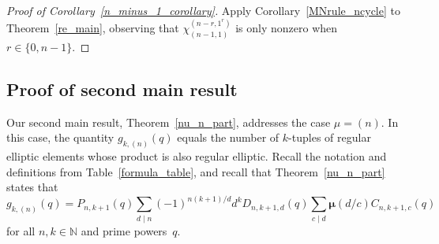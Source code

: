 \documentclass[10pt]{article}
\theoremstyle{definition}
\newcommand{\N}{\mathbb{N}}
\newcommand{\moebius}{\pmb{\mu}}
\begin{document}
\begin{proof}[Proof of Corollary~\ref{n_minus_1_corollary}]
Apply Corollary~\ref{MNrule_ncycle} to Theorem~\ref{re_main},
observing that \(\chi^{(n-r,1^r)}_{(n-1,1)}\) is only nonzero when \(r \in \{0,n-1\}\).
\end{proof}





























\subsection{Proof of second main result}
\label{nu_equals_n_section}

Our second main result, Theorem~\ref{nu_n_part}, addresses the case \(\mu = (n)\).
In this case, the quantity \(g_{k,(n)} (q)\) equals the number of \(k\)-tuples of regular elliptic elements whose product is also regular elliptic.
Recall the notation and definitions from Table~\ref{formula_table}, and recall that Theorem~\ref{nu_n_part} states that
\begin{equation}
g_{k,(n)}(q) = P_{n,k+1} (q)
\sum_{d \mid n}
(-1)^{n(k+1)/d}
d^{k}
D_{n,k+1,d} (q)
\sum_{c \mid d}
\moebius(d/c)
C_{n,k+1,c} (q)
\end{equation}
for all \(n, k \in \N\) and prime powers~\(q\).
\end{document}
